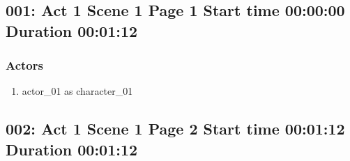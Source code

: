 \subsection{001: Act 1 Scene 1 Page 1 Start time 00:00:00 Duration 00:01:12}

\subsubsection{Actors}
\begin{enumerate}
\item actor\_01 as character\_01
\end{enumerate}


\subsection{002: Act 1 Scene 1 Page 2 Start time 00:01:12 Duration 00:01:12}

